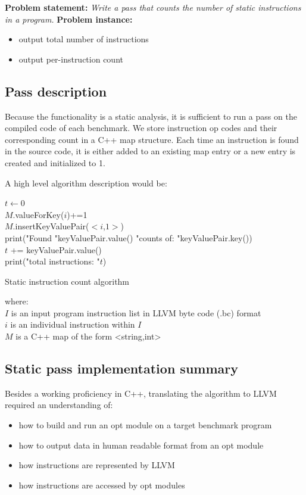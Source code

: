 \documentclass[letterpaper,twocolumn,10pt]{article}
\begin{document}
\textbf{Problem statement: }\textit{Write a pass that counts the number of static instructions in a program.}
\textbf{Problem instance:}
\begin{itemize}
\item output total number of instructions
\item output per-instruction count
\end{itemize}

\subsection{Pass description}

Because the functionality is a static analysis, it is sufficient to run a pass on the compiled code of each benchmark.
We store instruction op codes and their corresponding count in a C++ map structure. Each time an instruction is found in the source code, it is either added to an existing map entry or a new entry is created and initialized to 1.

A high level algorithm description would be:\\

\begin{algorithm}
 $t \gets 0$\\
 { 
 	{
 		$M$.valueForKey($i$)+=1\\
 	}
 	\Else
 	{
 		$M$.insertKeyValuePair($<i$,$1>$)\\
 	}
 }
 {
 	print("Found "keyValuePair.value() "counts of: "keyValuePair.key())\\
 	$t$ += keyValuePair.value()\\
 }
 print("total instructions: "$t$)
 \caption{Static instruction count algorithm}
\end{algorithm}
where:\\
$I$ is an input program instruction list in LLVM byte code (.bc) format\\
$i$ is an individual instruction within $I$\\
$M$ is a C++ map of the form <string,int>

\subsection{Static pass implementation summary}
Besides a working proficiency in C++, translating the algorithm to LLVM required an understanding of:
\begin{itemize}
\item how to build and run an opt module on a target benchmark program
\item how to output data in human readable format from an opt module
\item how instructions are represented by LLVM
\item how instructions are accessed by opt modules
\end{itemize}
\end{document}
